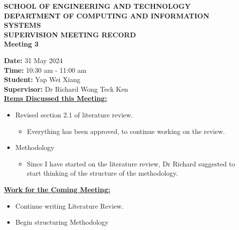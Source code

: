 \documentclass[a4paper, 12pt]{report}
\begin{document}
	
	\onehalfspacing
	
	\begin{center}
		
		\textbf{\large SCHOOL OF ENGINEERING AND TECHNOLOGY}	\\
		\textbf{\small DEPARTMENT OF COMPUTING AND INFORMATION SYSTEMS} \\
		\vspace{1cm}
		\textbf{\LARGE SUPERVISION MEETING RECORD}\\
		\textbf{\normalsize Meeting 3}	%
		
	\end{center}
	
	\noindent			%
	\textbf{Date: } 31 May 2024 \\	%
	\textbf{Time: } 10:30 am - 11:00 am \\	%
	\textbf{Student: } Yap Wei Xiang \\
	\textbf{Supervisor: } Dr Richard Wong Teck Ken \\
	
	\noindent			%
	\textbf{\underline{Items Discussed this Meeting: }}
	\begin{itemize}	%
		\item Revised section 2.1 of literature review.
		\begin{itemize}
			\item Everything has been approved, to continue working on the review.
		\end{itemize}
		
		\item Methodology
		\begin{itemize}
			\item Since I have started on the literature review, Dr Richard suggested to start thinking of the structure of the methodology.
		\end{itemize}
		
	\end{itemize}
	
	\noindent			%
	\textbf{\underline{Work for the Coming Meeting: }}
	\begin{itemize}	%
		\item Continue writing Literature Review.
		\item Begin structuring Methodology
	\end{itemize}
	
	\vfill
	
	
\end{document}
